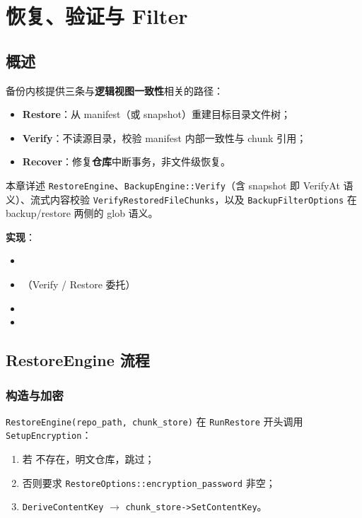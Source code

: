 \chapter{恢复、验证与 Filter}
\label{ch:restore-verify-v4}

\section{概述}

备份内核提供三条与\textbf{逻辑视图一致性}相关的路径：
\begin{itemize}[nosep]
  \item \textbf{Restore}：从 manifest（或 snapshot）重建目标目录文件树；
  \item \textbf{Verify}：不读源目录，校验 manifest 内部一致性与 chunk 引用；
  \item \textbf{Recover}：修复\textbf{仓库}中断事务，非文件级恢复。
\end{itemize}

本章详述 \texttt{RestoreEngine}、\texttt{BackupEngine::Verify}（含 snapshot 即 VerifyAt 语义）、流式内容校验 \texttt{VerifyRestoredFileChunks}，以及 \texttt{BackupFilterOptions} 在 backup/restore 两侧的 glob 语义。

\textbf{实现}：
\begin{itemize}[nosep]
  \item {}
  \item {}（Verify / Restore 委托）
  \item {}
  \item {}
\end{itemize}

\section{RestoreEngine 流程}

\subsection{构造与加密}

\texttt{RestoreEngine(repo\_path, chunk\_store)} 在 \texttt{RunRestore} 开头调用 \texttt{SetupEncryption}：
\begin{enumerate}
  \item 若  不存在，明文仓库，跳过；
  \item 否则要求 \texttt{RestoreOptions::encryption\_password} 非空；
  \item \texttt{DeriveContentKey} $\rightarrow$ \texttt{chunk\_store->SetContentKey}。
\end{enumerate}

